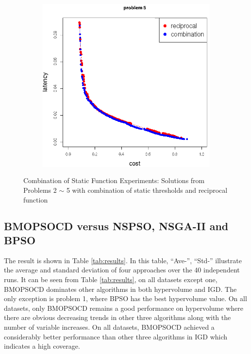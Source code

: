 \begin{figure}[h!]
\begin{subfigure}{0.49\textwidth}
	   \caption{}
   \end{subfigure}
   \begin{subfigure}{0.49\textwidth}
       \includegraphics[width=\textwidth]{pics/combination_problem5.png}
	   \caption{}
   \end{subfigure}
   \caption{Combination of Static Function Experiments: Solutions from Problems 2 $\sim$ 5 with combination of static thresholds and reciprocal function }
   \label{fig:combination}
\end{figure}



\subsection{BMOPSOCD versus NSPSO, NSGA-II and BPSO}
The result is shown in Table \ref{tab:results}. In this table, ``Ave-'', ``Std-'' illustrate the average and standard deviation 
of four approaches over the 40 independent runs.
It can be seen from Table \ref{tab:results}, on all datasets except one, BMOPSOCD dominates other algorithms in both hypervolume and IGD. The only exception
is problem 1, where BPSO has the best hypervolume value. On all datasets, only BMOPSOCD remains a good performance on hypervolume where there are obvious decreasing
trends in other three algorithms along with the number of variable increases. On all datasets, BMOPSOCD achieved a considerably better performance than other three
algorithms in IGD which indicates a high coverage.

